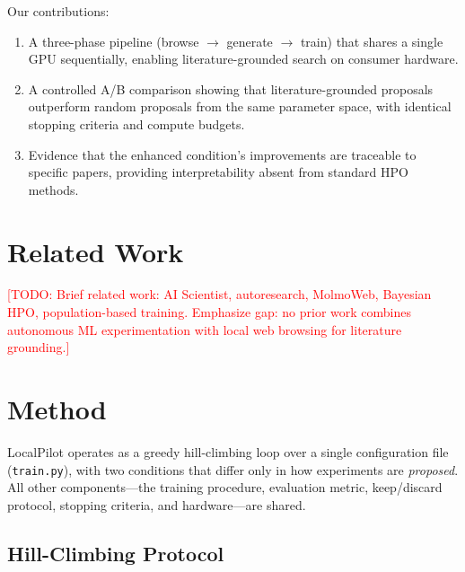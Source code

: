 \documentclass[11pt]{article}
\newcommand{\todo}[1]{\textcolor{red}{[TODO: #1]}}
\begin{document}
Our contributions:
\begin{enumerate}
  \item A three-phase pipeline (browse $\to$ generate $\to$ train) that
    shares a single GPU sequentially, enabling literature-grounded search
    on consumer hardware.
  \item A controlled A/B comparison showing that literature-grounded
    proposals outperform random proposals from the same parameter space,
    with identical stopping criteria and compute budgets.
  \item Evidence that the enhanced condition's improvements are traceable
    to specific papers, providing interpretability absent from standard
    HPO methods.
\end{enumerate}


\section{Related Work}
\label{sec:related}

\todo{Brief related work: AI Scientist, autoresearch, MolmoWeb,
Bayesian HPO, population-based training. Emphasize gap: no prior work
combines autonomous ML experimentation with local web browsing for
literature grounding.}


\section{Method}
\label{sec:method}

LocalPilot operates as a greedy hill-climbing loop over a single
configuration file (\texttt{train.py}), with two conditions that differ
only in how experiments are \emph{proposed}. All other components---the
training procedure, evaluation metric, keep/discard protocol, stopping
criteria, and hardware---are shared.

\subsection{Hill-Climbing Protocol}
\label{sec:hill-climbing}
\end{document}
